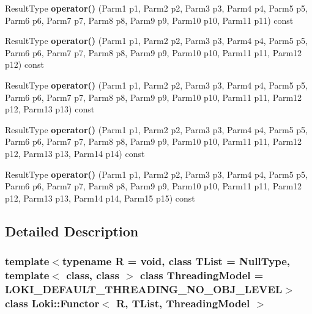 \begin{DoxyCompactItemize}
\item 
\hypertarget{classLoki_1_1Functor_a630323651893d0cfc3319fae64ffdc3a}{}Result\+Type {\bfseries operator()} (Parm1 p1, Parm2 p2, Parm3 p3, Parm4 p4, Parm5 p5, Parm6 p6, Parm7 p7, Parm8 p8, Parm9 p9, Parm10 p10, Parm11 p11) const \label{classLoki_1_1Functor_a630323651893d0cfc3319fae64ffdc3a}

\item 
\hypertarget{classLoki_1_1Functor_a660525925d453567eca096a3dc23e43b}{}Result\+Type {\bfseries operator()} (Parm1 p1, Parm2 p2, Parm3 p3, Parm4 p4, Parm5 p5, Parm6 p6, Parm7 p7, Parm8 p8, Parm9 p9, Parm10 p10, Parm11 p11, Parm12 p12) const \label{classLoki_1_1Functor_a660525925d453567eca096a3dc23e43b}

\item 
\hypertarget{classLoki_1_1Functor_ae8b69aa5a2ad4b49698f430a65ffcdf9}{}Result\+Type {\bfseries operator()} (Parm1 p1, Parm2 p2, Parm3 p3, Parm4 p4, Parm5 p5, Parm6 p6, Parm7 p7, Parm8 p8, Parm9 p9, Parm10 p10, Parm11 p11, Parm12 p12, Parm13 p13) const \label{classLoki_1_1Functor_ae8b69aa5a2ad4b49698f430a65ffcdf9}

\item 
\hypertarget{classLoki_1_1Functor_a6359fcbf61ca56ff94107361d6e513e5}{}Result\+Type {\bfseries operator()} (Parm1 p1, Parm2 p2, Parm3 p3, Parm4 p4, Parm5 p5, Parm6 p6, Parm7 p7, Parm8 p8, Parm9 p9, Parm10 p10, Parm11 p11, Parm12 p12, Parm13 p13, Parm14 p14) const \label{classLoki_1_1Functor_a6359fcbf61ca56ff94107361d6e513e5}

\item 
\hypertarget{classLoki_1_1Functor_a552520b5c8a985a7b0b51d8901e4145c}{}Result\+Type {\bfseries operator()} (Parm1 p1, Parm2 p2, Parm3 p3, Parm4 p4, Parm5 p5, Parm6 p6, Parm7 p7, Parm8 p8, Parm9 p9, Parm10 p10, Parm11 p11, Parm12 p12, Parm13 p13, Parm14 p14, Parm15 p15) const \label{classLoki_1_1Functor_a552520b5c8a985a7b0b51d8901e4145c}

\end{DoxyCompactItemize}


\subsection{Detailed Description}
\subsubsection*{template$<$typename R = void, class T\+List = Null\+Type, template$<$ class, class $>$ class Threading\+Model = L\+O\+K\+I\+\_\+\+D\+E\+F\+A\+U\+L\+T\+\_\+\+T\+H\+R\+E\+A\+D\+I\+N\+G\+\_\+\+N\+O\+\_\+\+O\+B\+J\+\_\+\+L\+E\+V\+E\+L$>$class Loki\+::\+Functor$<$ R, T\+List, Threading\+Model $>$}

